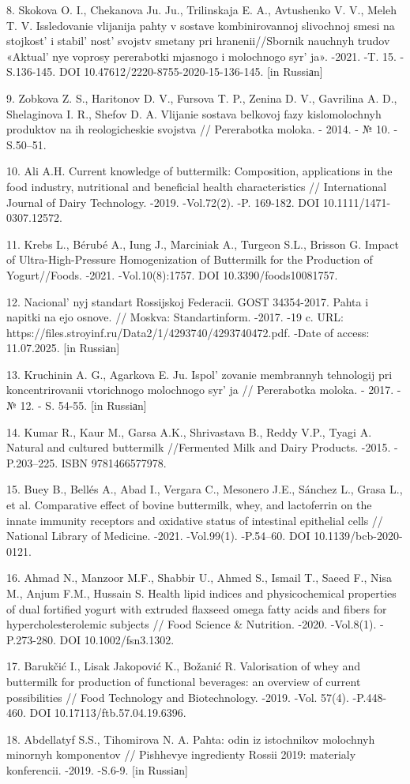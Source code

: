 \begin{refs}
8. Skokova O. I., Chekanova Ju. Ju., Trilinskaja E. A., Avtushenko V.
V., Meleh T. V. Issledovanie vlijanija pahty v sostave kombinirovannoj
slivochnoj smesi na stojkost'{} i
stabil' nost'{} svojstv smetany pri
hranenii//Sbornik nauchnyh trudov «Aktual' nye voprosy
pererabotki mjasnogo i molochnogo syr' ja». -2021. -T.
15. - S.136-145. DOI 10.47612/2220-8755-2020-15-136-145. {[}in
Russiаn{]}

9. Zobkova Z. S., Haritonov D. V., Fursova T. P., Zenina D. V.,
Gavrilina A. D., Shelaginova I. R., Shefov D. A. Vlijanie sostava
belkovoj fazy kislomolochnyh produktov na ih reologicheskie svojstva //
Pererabotka moloka. - 2014. - № 10. - S.50--51.

10. Ali A.H. Current knowledge of buttermilk: Composition, applications
in the food industry, nutritional and beneficial health characteristics
// International Journal of Dairy Technology. -2019. -Vol.72(2). -P.
169-182. DOI 10.1111/1471-0307.12572.

11. Krebs L., Bérubé A., Iung J., Marciniak A., Turgeon S.L., Brisson G.
Impact of Ultra-High-Pressure Homogenization of Buttermilk for the
Production of Yogurt//Foods. -2021. -Vol.10(8):1757. DOI
10.3390/foods10081757.

12. Nacional' nyj standart Rossijskoj Federacii. GOST
34354-2017. Pahta i napitki na ejo osnove. // Moskva: Standartinform.
-2017. -19 c. URL:
https://files.stroyinf.ru/Data2/1/4293740/4293740472.pdf. -Date of
access: 11.07.2025. {[}in Russiаn{]}

13. Kruchinin A. G., Agarkova E. Ju. Ispol' zovanie
membrannyh tehnologij pri koncentrirovanii vtorichnogo molochnogo
syr' ja // Pererabotka moloka. - 2017. - № 12. - S.
54-55. {[}in Russiаn{]}

14. Kumar R., Kaur M., Garsa A.K., Shrivastava B., Reddy V.P., Tyagi A.
Natural and cultured buttermilk //Fermented Milk and Dairy Products.
-2015. -P.203--225. ISBN 9781466577978.

15. Buey B., Bellés A., Abad I., Vergara C., Mesonero J.E., Sánchez L.,
Grasa L., et al. Comparative effect of bovine buttermilk, whey, and
lactoferrin on the innate immunity receptors and oxidative status of
intestinal epithelial cells // National Library of Medicine. -2021.
-Vol.99(1). -P.54--60. DOI 10.1139/bcb-2020-0121.

16. Ahmad N., Manzoor M.F., Shabbir U., Ahmed S., Ismail T., Saeed F.,
Nisa M., Anjum F.M., Hussain S. Health lipid indices and physicochemical
properties of dual fortified yogurt with extruded flaxseed omega fatty
acids and fibers for hypercholesterolemic subjects // Food Science \&
Nutrition. -2020. -Vol.8(1). -P.273-280. DOI 10.1002/fsn3.1302.

17. Barukčić I., Lisak Jakopović K., Božanić R. Valorisation of whey and
buttermilk for production of functional beverages: an overview of
current possibilities // Food Technology and Biotechnology. -2019. -Vol.
57(4). -P.448-460. DOI 10.17113/ftb.57.04.19.6396.

18. Abdellatyf S.S., Tihomirova N. A. Pahta: odin iz istochnikov
molochnyh minornyh komponentov // Pishhevye ingredienty Rossii 2019:
materialy konferencii. -2019. -S.6-9. {[}in Russiаn{]}
\end{refs}

